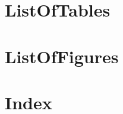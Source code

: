 \documentclass{book}
\begin{document}
	\iflatexml
	\else
		\dominitoc %
	\fi
	\frontmatter
    
	\mainmatter
	
	\iflatexml
	\else
		\adjustmtc %
	\fi
	
	
	
	
	
	
	
	


%	
%	
%	
%
%
\begin{appendices}
	\iflatexml
	\else
	\adjustmtc %
	\fi
	
	
	
%		
	
%	
	
\end{appendices}


\pagebreak
\backmatter
\vfill
\pagebreak
\iflatexml
\chapter*{ListOfTables\label{Ch:ListOfTables}}
\else
\fi

\listoftables {}
\vfill

\pagebreak
\iflatexml
\chapter*{ListOfFigures\label{Ch:ListOfFigures}}
\else
\fi
\listoffigures {} 
\vfill
\pagebreak

\iflatexml
\chapter*{Index\label{Ch:Index}}\label{index}\label{Index}
\end{document}
